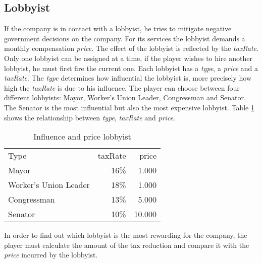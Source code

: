 \subsection{Lobbyist} \label{lobbyist_simulation}

If the company is in contact with a lobbyist, he tries to mitigate negative government decisions on the company. For its services the lobbyist demands a monthly compensation \textit{price}. The effect of the lobbyist is reflected by the \textit{taxRate}. \\

Only one lobbyist can be assigned at a time, if the player wishes to hire another lobbyist, he must first fire the current one. Each lobbyist has a \textit{type}, a \textit{price} and a \textit{taxRate}. The \textit{type} determines how influential the lobbyist is, more precisely how high the \textit{taxRate} is due to his influence. The player can choose between four different lobbyists: Mayor, Worker’s Union Leader, Congressman and Senator. The Senator is the most influential but also the most expensive lobbyist. Table \ref{influence_lobbyist} shows the relationship between \textit{type}, \textit{taxRate} and \textit{price}. \\

\begin{table}[ht]
\centering
\begin{tabular}{|l|r|r|}
\hline
Type                    & taxRate   & price \\
Mayor                   & 16\%      & 1.000     \\
Worker's Union Leader   & 18\%      & 1.000     \\
Congressman             & 13\%      & 5.000     \\
Senator                 & 10\%      & 10.000     \\
\hline
\end{tabular}
\caption{Influence and price lobbyist}
\label{influence_lobbyist}
\end{table}

In order to find out which lobbyist is the most rewarding for the company, the player must calculate the amount of the tax reduction and compare it with the \textit{price} incurred by the lobbyist.
 



 




